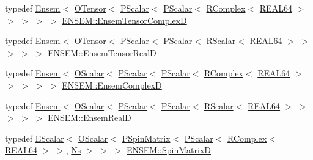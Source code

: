 \begin{DoxyCompactItemize}
\item 
typedef \mbox{\hyperlink{classENSEM_1_1Ensem}{Ensem}}$<$ \mbox{\hyperlink{classENSEM_1_1OTensor}{O\+Tensor}}$<$ \mbox{\hyperlink{classENSEM_1_1PScalar}{P\+Scalar}}$<$ \mbox{\hyperlink{classENSEM_1_1PScalar}{P\+Scalar}}$<$ \mbox{\hyperlink{classENSEM_1_1RComplex}{R\+Complex}}$<$ \mbox{\hyperlink{namespaceENSEM_a85b215b9f1f43715aebee01718e25082}{R\+E\+A\+L64}} $>$ $>$ $>$ $>$ $>$ \mbox{\hyperlink{group__defs_ga15d48d3a11743bbf79e7b90cf889f3f0}{E\+N\+S\+E\+M\+::\+Ensem\+Tensor\+ComplexD}}
\item 
typedef \mbox{\hyperlink{classENSEM_1_1Ensem}{Ensem}}$<$ \mbox{\hyperlink{classENSEM_1_1OTensor}{O\+Tensor}}$<$ \mbox{\hyperlink{classENSEM_1_1PScalar}{P\+Scalar}}$<$ \mbox{\hyperlink{classENSEM_1_1PScalar}{P\+Scalar}}$<$ \mbox{\hyperlink{classENSEM_1_1RScalar}{R\+Scalar}}$<$ \mbox{\hyperlink{namespaceENSEM_a85b215b9f1f43715aebee01718e25082}{R\+E\+A\+L64}} $>$ $>$ $>$ $>$ $>$ \mbox{\hyperlink{group__defs_gaa7c1a5f20d03b806876d3ab2576ec104}{E\+N\+S\+E\+M\+::\+Ensem\+Tensor\+RealD}}
\item 
typedef \mbox{\hyperlink{classENSEM_1_1Ensem}{Ensem}}$<$ \mbox{\hyperlink{classENSEM_1_1OScalar}{O\+Scalar}}$<$ \mbox{\hyperlink{classENSEM_1_1PScalar}{P\+Scalar}}$<$ \mbox{\hyperlink{classENSEM_1_1PScalar}{P\+Scalar}}$<$ \mbox{\hyperlink{classENSEM_1_1RComplex}{R\+Complex}}$<$ \mbox{\hyperlink{namespaceENSEM_a85b215b9f1f43715aebee01718e25082}{R\+E\+A\+L64}} $>$ $>$ $>$ $>$ $>$ \mbox{\hyperlink{group__defs_gaa1c62d46cc410553bbcb87757e212505}{E\+N\+S\+E\+M\+::\+Ensem\+ComplexD}}
\item 
typedef \mbox{\hyperlink{classENSEM_1_1Ensem}{Ensem}}$<$ \mbox{\hyperlink{classENSEM_1_1OScalar}{O\+Scalar}}$<$ \mbox{\hyperlink{classENSEM_1_1PScalar}{P\+Scalar}}$<$ \mbox{\hyperlink{classENSEM_1_1PScalar}{P\+Scalar}}$<$ \mbox{\hyperlink{classENSEM_1_1RScalar}{R\+Scalar}}$<$ \mbox{\hyperlink{namespaceENSEM_a85b215b9f1f43715aebee01718e25082}{R\+E\+A\+L64}} $>$ $>$ $>$ $>$ $>$ \mbox{\hyperlink{group__defs_gaabc6e707d8e7066c144fa8f9fa002f2e}{E\+N\+S\+E\+M\+::\+Ensem\+RealD}}
\item 
typedef \mbox{\hyperlink{classENSEM_1_1EScalar}{E\+Scalar}}$<$ \mbox{\hyperlink{classENSEM_1_1OScalar}{O\+Scalar}}$<$ \mbox{\hyperlink{classENSEM_1_1PSpinMatrix}{P\+Spin\+Matrix}}$<$ \mbox{\hyperlink{classENSEM_1_1PScalar}{P\+Scalar}}$<$ \mbox{\hyperlink{classENSEM_1_1RComplex}{R\+Complex}}$<$ \mbox{\hyperlink{namespaceENSEM_a85b215b9f1f43715aebee01718e25082}{R\+E\+A\+L64}} $>$ $>$, \mbox{\hyperlink{namespaceENSEM_a6f05e048f9b2eb1a19131074f8abc25f}{Ns}} $>$ $>$ $>$ \mbox{\hyperlink{group__defs_ga9a03c1e03f1df3df33fe8cf7f4a8786f}{E\+N\+S\+E\+M\+::\+Spin\+MatrixD}}

\end{DoxyCompactItemize}
